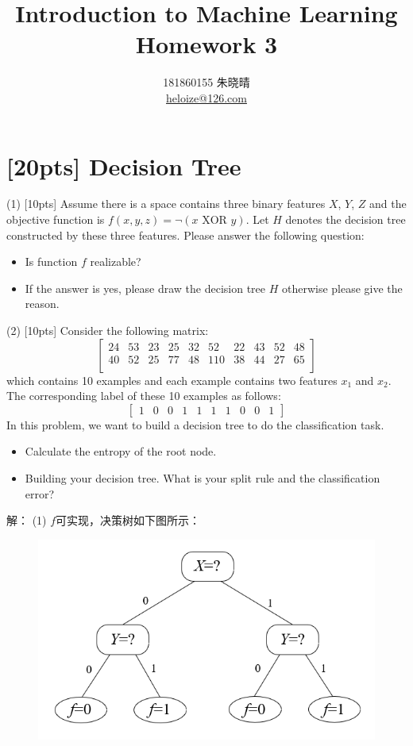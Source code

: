 \documentclass{article}
\title{Introduction to Machine Learning\\Homework 3}
\author{181860155 朱晓晴\\\href{mailto:heloize@126.com}{heloize@126.com}}
\begin{document}
	\maketitle
	
	\section{[20pts] Decision Tree}

	\noindent (1) [10pts] Assume there is a space contains three binary features $X$, $Y$, $Z$ and the objective function is $f(x,y,z)=\neg(x \text{ XOR } y)$. Let $H$ denotes the decision tree constructed by these three features. Please answer the following question:
	\begin{itemize}
		\item Is function $f$ realizable? 
		\item If the answer is yes, please draw the decision tree $H$ otherwise please give the reason.\\
	\end{itemize}
	(2) [10pts] Consider the following matrix:
	$$
	\left[
	\begin{matrix}
	24 & 53 & 23 & 25 & 32 & 52 & 22 & 43 & 52 & 48 \\
	40 & 52 & 25 & 77 & 48 & 110 & 38 & 44 & 27 & 65\\
	\end{matrix}
	\right]
	$$
	which contains 10 examples and each example contains two features $x_1$ and $x_2$. The corresponding label of these 10 examples as follows:
	$$
	\left[
	\begin{matrix}
	1 & 0 & 0 &1 & 1 & 1 & 1& 0 & 0 & 1
	\end{matrix}
	\right]
	$$
	In this problem, we want to build a decision tree to do the classification task.
	\begin{itemize}
		\item Calculate the entropy of the root node.
		\item Building your decision tree. What is your split rule  and the classification error?\\
	\end{itemize}
	解：
	(1) $f$可实现，决策树如下图所示：
	\begin{figure}[H]
		\centering
		\includegraphics[scale=0.7]{p1-dt1.PNG}
	\end{figure}
\end{document}
